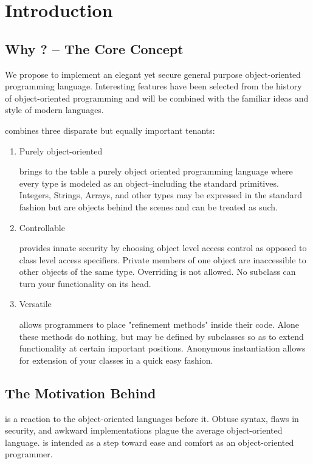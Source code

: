 \section{Introduction}
\subsection{Why \Lang{}? -- The Core Concept}
We propose to implement an elegant yet secure general purpose object-oriented programming language. Interesting features have been selected from the history of object-oriented programming and will be combined with the familiar ideas and style of modern languages.

\Lang{} combines three disparate but equally important tenants:


\begin{enumerate}
\item Purely object-oriented 

\Lang{} brings to the table a purely object oriented programming language where every type is modeled as an object--including the standard primitives. Integers, Strings, Arrays, and other types may be expressed in the standard fashion but are objects behind the scenes and can be treated as such.

\item Controllable

\Lang{} provides innate security by choosing object level access control as opposed to class level access specifiers. Private members of one object are inaccessible to other objects of the same type. Overriding is not allowed. No subclass can turn your functionality on its head.

\item Versatile

\Lang{} allows programmers to place "refinement methods" inside their code. Alone these methods do nothing, but may be defined by subclasses so as to extend functionality at certain important positions. Anonymous instantiation allows for extension of your classes in a quick easy fashion.
\end{enumerate}

\subsection{The Motivation Behind \Lang{}}
\Lang{} is a reaction to the object-oriented languages before it. Obtuse syntax, flaws in security, and awkward implementations plague the average object-oriented language. \Lang{} is intended as a step toward ease and comfort as an object-oriented programmer.

